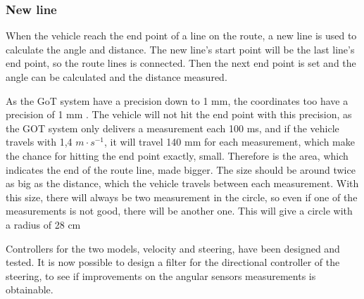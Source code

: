 \subsubsection{New line}
When the vehicle reach the end point of a line on the route, a new line is used to calculate the angle and distance. The new line's start point will be the last line's end point, so the route lines is connected. Then the next end point is set and the angle can be calculated and the distance measured.

As the GoT system have a precision down to 1 mm, the coordinates too have a precision of 1 mm . The vehicle will not hit the end point with this precision, as the GOT system only delivers a measurement each 100 ms, and if the vehicle travels with 1,4 $m \cdot s^{-1}$, it will travel 140 mm for each measurement, which make the chance for hitting the end point exactly, small. Therefore is the area, which indicates the end of the route line, made bigger. The size should be around twice as big as the distance, which the vehicle travels between each measurement. With this size, there will always be two measurement in the circle, so even if one of the measurements is not good, there will be another one. This will give a circle with a radius of 28 cm

Controllers for the two models, velocity and steering, have been designed and tested. It is now possible to design a filter for the directional controller of the steering, to see if improvements on the angular sensors measurements is obtainable.